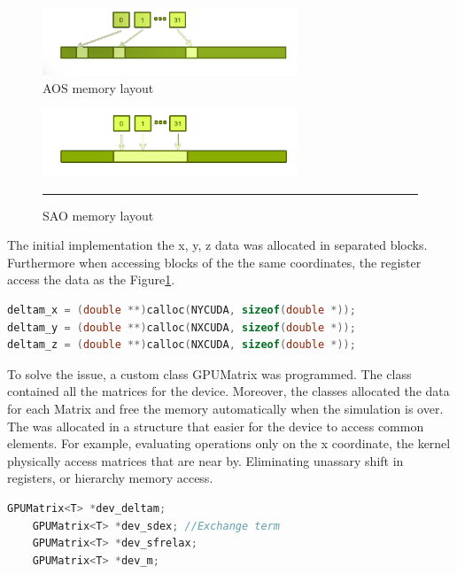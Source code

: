 \begin{figure}[htbp]
	\centering
		\includegraphics[width=0.68\textwidth]{Figures/aos.png}
		\smallskip
	\caption[Array of structures (AOS)]{AOS memory layout }
	\label{fig:aos}
\end{figure}


\begin{figure}[htbp]
	\centering
		\includegraphics[width=0.68\textwidth]{Figures/soa.png}
		\rule{35em}{0.2pt}
	\caption[Structure of Arrays (SAO)]{SAO memory layout}
	\label{fig:sao}
\end{figure}

The initial implementation the  x, y, z data was allocated in separated blocks. Furthermore when accessing blocks of the the same coordinates, the register access the data as the Figure\ref{fig:aos}.

\begin{lstlisting}[language=C++, caption={AOS implementation}]
deltam_x = (double **)calloc(NYCUDA, sizeof(double *));
deltam_y = (double **)calloc(NXCUDA, sizeof(double *));
deltam_z = (double **)calloc(NXCUDA, sizeof(double *));
\end{lstlisting}

To solve the issue, a custom class GPUMatrix was programmed. The class contained all the matrices for the device. Moreover, the classes allocated the data for each Matrix and free the memory automatically when the simulation is over. The was allocated in a structure that easier for the device to access common elements. For example, evaluating operations only on the x coordinate, the kernel physically access matrices that are near by. Eliminating unassary shift in registers, or hierarchy memory access.

\begin{lstlisting}[language=C++, caption={SOA implementation}]
    GPUMatrix<T> *dev_deltam;
    GPUMatrix<T> *dev_sdex; //Exchange term
    GPUMatrix<T> *dev_sfrelax;
    GPUMatrix<T> *dev_m; 
\end{lstlisting}

